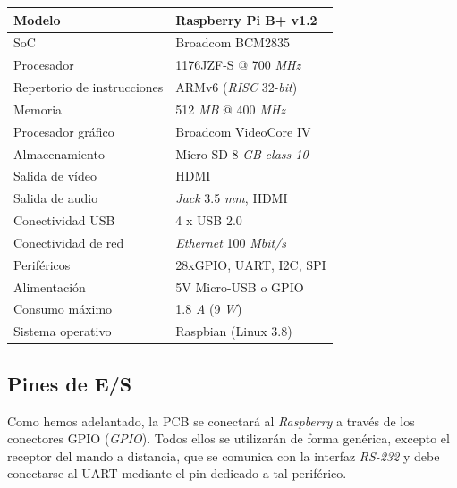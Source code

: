 \begin{center}
	\begin{tabular}{|l|l|}
		\hline Modelo & Raspberry Pi B+ v1.2 \\
		\hline SoC & Broadcom BCM2835 \\
		\hline Procesador &  1176JZF-S @ 700 \textit{MHz} \\
		\hline Repertorio de instrucciones & ARMv6 (\textit{RISC} 32-\textit{bit}) \\
		\hline Memoria & 512 \textit{MB} @ 400 \textit{MHz} \\
		\hline Procesador gráfico & Broadcom VideoCore IV \\ 		
		\hline Almacenamiento & Micro-\acrshort{SD} 8 \textit{GB} \textit{class 10} \\
		\hline Salida de vídeo & \acrshort{HDMI} \\
		\hline Salida de audio & \textit{Jack} 3.5 \textit{mm}, \acrshort{HDMI} \\
		\hline Conectividad USB & 4 x \acrshort{USB} 2.0 \\
		\hline Conectividad de red & \textit{Ethernet} 100 \textit{Mbit/s} \\
		\hline Periféricos & 28xGPIO, \acrshort{UART}, \acrshort{I2C}, \acrshort{SPI} \\ 
		\hline Alimentación & 5V Micro-\acrshort{USB} o \acrshort{GPIO} \\
		\hline Consumo máximo & 1.8 \textit{A} (9 \textit{W}) \\ 
		\hline Sistema operativo & Raspbian (Linux 3.8) \\
		\hline 
	\end{tabular}
	\smallskip

\end{center}

\smallskip

\subsection{Pines de E/S}

Como hemos adelantado, la \acrshort{PCB} se conectará al \textit{Raspberry} a través de los conectores \acrshort{GPIO} (\textit{\acrlong{GPIO}}). Todos ellos se utilizarán de forma genérica, excepto el receptor del mando a distancia, que se comunica con la interfaz \textit{RS-232} y debe conectarse al \acrshort{UART} mediante el pin dedicado a tal periférico.

